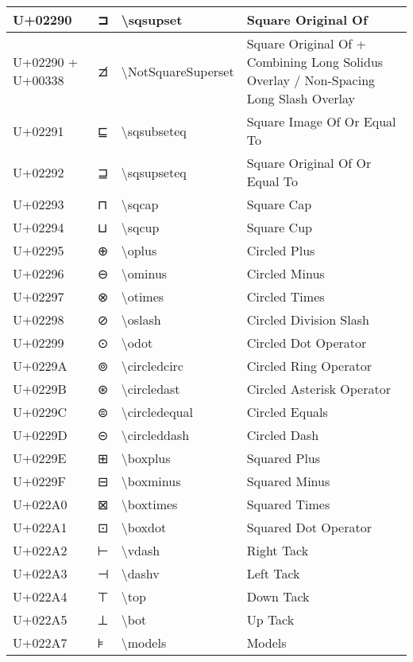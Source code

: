 \begin{table}[h]
\begin{tabulary}{\linewidth}{|L|L|L|L|}
\hline
U+02290 & ⊐ & {\textbackslash}sqsupset & Square Original Of \\
\hline
U+02290 + U+00338 & ⊐̸ & {\textbackslash}NotSquareSuperset & Square Original Of + Combining Long Solidus Overlay / Non-Spacing Long Slash Overlay \\
\hline
U+02291 & ⊑ & {\textbackslash}sqsubseteq & Square Image Of Or Equal To \\
\hline
U+02292 & ⊒ & {\textbackslash}sqsupseteq & Square Original Of Or Equal To \\
\hline
U+02293 & ⊓ & {\textbackslash}sqcap & Square Cap \\
\hline
U+02294 & ⊔ & {\textbackslash}sqcup & Square Cup \\
\hline
U+02295 & ⊕ & {\textbackslash}oplus & Circled Plus \\
\hline
U+02296 & ⊖ & {\textbackslash}ominus & Circled Minus \\
\hline
U+02297 & ⊗ & {\textbackslash}otimes & Circled Times \\
\hline
U+02298 & ⊘ & {\textbackslash}oslash & Circled Division Slash \\
\hline
U+02299 & ⊙ & {\textbackslash}odot & Circled Dot Operator \\
\hline
U+0229A & ⊚ & {\textbackslash}circledcirc & Circled Ring Operator \\
\hline
U+0229B & ⊛ & {\textbackslash}circledast & Circled Asterisk Operator \\
\hline
U+0229C & ⊜ & {\textbackslash}circledequal & Circled Equals \\
\hline
U+0229D & ⊝ & {\textbackslash}circleddash & Circled Dash \\
\hline
U+0229E & ⊞ & {\textbackslash}boxplus & Squared Plus \\
\hline
U+0229F & ⊟ & {\textbackslash}boxminus & Squared Minus \\
\hline
U+022A0 & ⊠ & {\textbackslash}boxtimes & Squared Times \\
\hline
U+022A1 & ⊡ & {\textbackslash}boxdot & Squared Dot Operator \\
\hline
U+022A2 & ⊢ & {\textbackslash}vdash & Right Tack \\
\hline
U+022A3 & ⊣ & {\textbackslash}dashv & Left Tack \\
\hline
U+022A4 & ⊤ & {\textbackslash}top & Down Tack \\
\hline
U+022A5 & ⊥ & {\textbackslash}bot & Up Tack \\
\hline
U+022A7 & ⊧ & {\textbackslash}models & Models \\

\end{tabulary}
\end{table}
